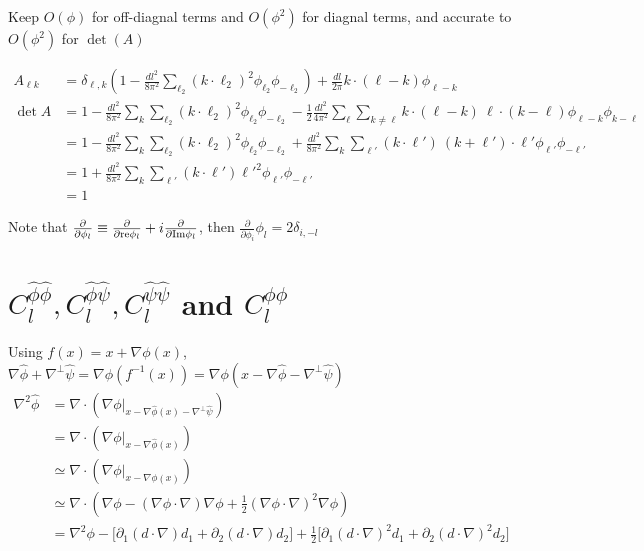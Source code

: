 \documentclass[noinfoline]{imsart}
\newcommand{\pinv}{\hat\phi}
\newcommand{\sinv}{\hat\psi}
\begin{document}
Keep $O(\phi)$ for off-diagnal terms and $O(\phi^2)$ for diagnal terms, and accurate to $O(\phi^2)$ for $\det (A)$

\begin{align}
A_{\ell k}
&= \delta_{\ell,k} \left(1-\frac{dl^2}{8\pi^2}\sum_{\ell_2}   (k\cdot\ell_2)^2
  \phi_{\ell_2}\phi_{-\ell_2} \right) + \frac{dl}{2\pi} k\cdot(\ell-k)\phi_{\ell-k}\\
\det A
&=1-\frac{dl^2}{8\pi^2}\sum_k\sum_{\ell_2}   (k\cdot\ell_2)^2 \phi_{\ell_2}\phi_{-\ell_2}
-\frac{1}{2} \frac{dl^2}{4\pi^2} \sum_\ell \sum_{k\neq\ell} k\cdot(\ell-k)\ \ell\cdot(k-\ell)\phi_{\ell-k}\phi_{k-\ell}\nonumber\\
&=1-\frac{dl^2}{8\pi^2}\sum_k\sum_{\ell_2}   (k\cdot\ell_2)^2 \phi_{\ell_2}\phi_{-\ell_2}
+\frac{dl^2}{8\pi^2} \sum_k \sum_{\ell'}  (k\cdot\ell')\ (k+\ell')\cdot\ell'\phi_{\ell'}\phi_{-\ell'}\nonumber\\
&=1+\frac{dl^2}{8\pi^2} \sum_k \sum_{\ell'} (k\cdot\ell') {\ell'}^2 \phi_{\ell'}\phi_{-\ell'} \nonumber\\
&=1
\end{align}

Note that $\frac{\partial}{\partial \phi_l}
\equiv \frac{\partial}{\partial{\rm re} \phi_l} +i\frac{\partial}{\partial{\rm Im} \phi_l} $, then
$\frac{\partial}{\partial \phi_i} \phi_{l} = 2 \delta_{i,-l}$

\section{$C_l^{\pinv\pinv}, C_l^{\pinv\sinv}, C_l^{\sinv\sinv}$ and $C_l^{\phi\phi}$}

Using $f(x) = x + \nabla\phi(x)$,
$\nabla\pinv + \nabla^\perp \sinv = \nabla\phi(f^{-1}(x)) = \nabla\phi(x-\nabla\pinv-\nabla^\perp\sinv)$
\begin{align}
  \nabla^2\pinv
  &= \nabla\cdot \left(\nabla\phi|_{x-\nabla\pinv(x)-\nabla^\perp\sinv}\right)\nonumber\\
  &= \nabla\cdot \left(\nabla\phi|_{x-\nabla\pinv(x)}\right) \nonumber\\
  &\simeq \nabla\cdot \left(\nabla\phi|_{x-\nabla\phi(x)}\right) \nonumber\\
  &\simeq \nabla\cdot \left(\nabla\phi-(\nabla\phi\cdot\nabla)\nabla\phi + \frac{1}{2}(\nabla\phi\cdot\nabla)^2\nabla\phi\right)\nonumber\\
  &=\nabla^2\phi - \Big[ \partial_1(d\cdot\nabla)d_1 + \partial_2(d\cdot\nabla)d_2 \Big]
  +\frac{1}{2}\Big[ \partial_1(d\cdot\nabla)^2d_1 + \partial_2(d\cdot\nabla)^2d_2 \Big]
\end{align}
\end{document}
